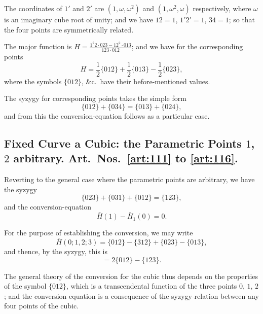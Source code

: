 \documentclass[11pt,a4paper]{book}
\begin{document}
\begin{art}\label{art:108}
The coordinates of $1'$ and $2'$ are $(1, \omega, \omega^2)$ and $(1, \omega^2, \omega)$ respectively, where $\omega$ is an imaginary cube root of unity; and we have $12 = 1$, $1'2' = 1$, $34 = 1$; so that the four points are symmetrically related.
\end{art}

\begin{art}\label{art:109}
The major function is $H = \frac{1^2 2 \cdot 023 - 12^2 \cdot 013}{123 \cdot 012}$; and we have for the corresponding points
\[
H = \frac{1}{2}\{012\} + \frac{1}{2}\{013\} - \frac{1}{2}\{023\},
\]
where the symbols $\{012\}$, \&c.\ have their before-mentioned values.
\end{art}

\begin{art}\label{art:110}
The syzygy for corresponding points takes the simple form
\[
\{012\} + \{034\} = \{013\} + \{024\},
\]
and from this the conversion-equation follows as a particular case.
\end{art}

\newpage
\subsection*{Fixed Curve a Cubic: the Parametric Points $1$, $2$ arbitrary. Art.~Nos.~\ref{art:111} to \ref{art:116}.}

\begin{art}\label{art:111}
Reverting to the general case where the parametric points are arbitrary, we have the syzygy
\[
\{023\} + \{031\} + \{012\} = \{123\},
\]
and the conversion-equation
\[
\bar{H}(1) - \bar{H}_1(0) = 0.
\]
\end{art}

\begin{art}\label{art:112}
For the purpose of establishing the conversion, we may write
\[
\bar{H}(0; 1, 2; 3) = \{012\} - \{312\} + \{023\} - \{013\},
\]
and thence, by the syzygy, this is
\[
= 2\{012\} - \{123\}.
\]
\end{art}

\begin{art}\label{art:113}
The general theory of the conversion for the cubic thus depends on the properties of the symbol $\{012\}$, which is a transcendental function of the three points $0$, $1$, $2$; and the conversion-equation is a consequence of the syzygy-relation between any four points of the cubic.
\end{art}
\end{document}
